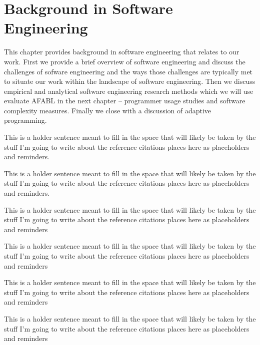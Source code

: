 \chapter{Background in Software Engineering}\label{ch:se}

This chapter provides background in software engineering that relates to our work. First we provide a brief overview of software engineering and discuss the challenges of sofware engineering and the ways those challenges are typically met to situate our work within the landscape of software engineering. Then we discuss empirical and analytical software engineering research methods which we will use evaluate AFABL in the next chapter -- programmer usage studies and software complexity measures. Finally we close with a discussion of adaptive programming.

\cite{polancic2010a-an-empirical}

This is a holder sentence meant to fill in the space that will likely be taken by the stuff I'm going to write about the reference citations places here as placeholders and reminders.

\cite{buse2011a-benefits}

This is a holder sentence meant to fill in the space that will likely be taken by the stuff I'm going to write about the reference citations places here as placeholders and reminders.

\cite{lorenz2011a-code}

This is a holder sentence meant to fill in the space that will likely be taken by the stuff I'm going to write about the reference citations places here as placeholders and reminders

\cite{basili1986a-experimentation}

This is a holder sentence meant to fill in the space that will likely be taken by the stuff I'm going to write about the reference citations places here as placeholders and reminders

\cite{gacek1995a-exploiting}

This is a holder sentence meant to fill in the space that will likely be taken by the stuff I'm going to write about the reference citations places here as placeholders and reminders

\cite{runeson2009a-guidelines}

This is a holder sentence meant to fill in the space that will likely be taken by the stuff I'm going to write about the reference citations places here as placeholders and reminders


